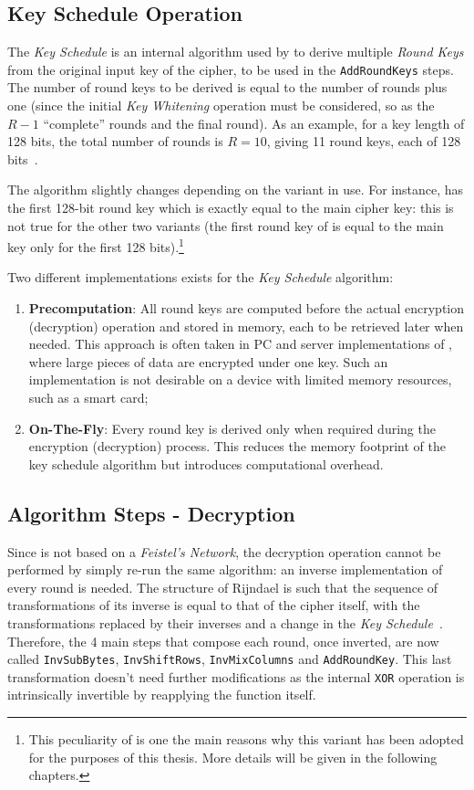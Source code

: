         \subsection{Key Schedule Operation}\label{subsubsec:keyschedule}
        The \emph{Key Schedule} is an internal algorithm used by \aes{} to derive multiple \emph{Round Keys} from the original input key of the cipher, to be used in the \texttt{AddRoundKeys} steps. The number of round keys to be derived is equal to the number of rounds plus one (since the initial \emph{Key Whitening} operation must be considered, so as the $R-1$ ``complete'' rounds and the final round). As an example, for a key length of 128 bits, the total number of rounds is $R = 10$, giving 11 round keys, each of 128 bits~\cite{paar2009understanding}.

        The algorithm slightly changes depending on the \aes{} variant in use. For instance, \aess{} has the first 128-bit round key which is exactly equal to the main cipher key: this is not true for the other two \aes{} variants (the first round key of \aesss{} is equal to the main key only for the first 128 bits).\footnote{This peculiarity of \aess{} is one the main reasons why this variant has been adopted for the purposes of this thesis. More details will be given in the following chapters.}

        Two different implementations exists for the \emph{Key Schedule} algorithm:
        \begin{enumerate}
            \item \textbf{Precomputation}: All round keys are computed before the actual encryption (decryption) operation and stored in memory, each to be retrieved later when needed. This approach is often taken in PC and server implementations of \aes{}, where large pieces of data are encrypted under one key. Such an implementation is not desirable on a device with limited memory resources, such as a smart card;
            \item \textbf{On-The-Fly}: Every round key is derived only when required during the encryption (decryption) process. This reduces the memory footprint of the key schedule algorithm but introduces computational overhead.
        \end{enumerate}

    \subsection{Algorithm Steps - Decryption}
        Since \aes{} is not based on a \emph{Feistel's Network}, the decryption operation cannot be performed by simply re-run the same algorithm: an inverse implementation of every round is needed. The structure of Rijndael is such that the sequence of transformations of its inverse is equal to that of the cipher itself, with the transformations replaced by their inverses and a change in the \emph{Key Schedule}~\cite{daemen1999aes}. Therefore, the 4 main steps that compose each round, once inverted, are now called \texttt{InvSubBytes}, \texttt{InvShiftRows}, \texttt{InvMixColumns} and \texttt{AddRoundKey}. This last transformation doesn't need further modifications as the internal \texttt{XOR} operation is intrinsically invertible by reapplying the function itself.


